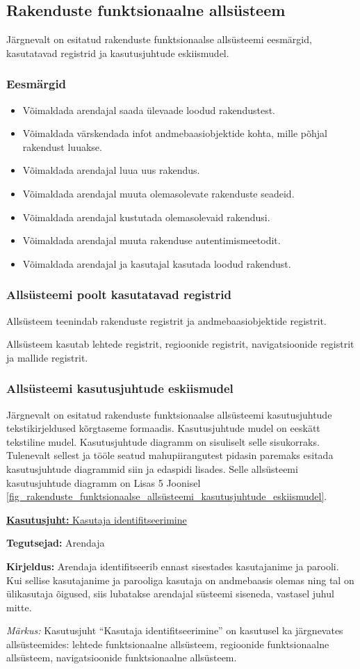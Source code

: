 \documentclass[a4paper,12pt]{article} %
\begin{document}
\subsection{Rakenduste funktsionaalne allsüsteem}
Järgnevalt on esitatud rakenduste funktsionaalse allsüsteemi eesmärgid, kasutatavad registrid ja kasutusjuhtude eskiismudel.
\subsubsection{Eesmärgid}
\begin{itemize}
\item Võimaldada arendajal saada ülevaade loodud rakendustest.
\item Võimaldada värskendada infot andmebaasiobjektide kohta, mille põhjal rakendust luuakse.
\item Võimaldada arendajal luua uus rakendus.
\item Võimaldada arendajal muuta olemasolevate rakenduste seadeid.
\item Võimaldada arendajal kustutada olemasolevaid rakendusi.
\item Võimaldada arendajal muuta rakenduse autentimismeetodit.
\item Võimaldada arendajal ja kasutajal kasutada loodud rakendust.
\end{itemize}
\subsubsection{Allsüsteemi poolt kasutatavad registrid}
Allsüsteem teenindab rakenduste registrit ja andmebaasiobjektide registrit.\par
Allsüsteem kasutab lehtede registrit, regioonide registrit, navigatsioonide registrit ja mallide registrit.
\subsubsection{Allsüsteemi kasutusjuhtude eskiismudel}
Järgnevalt on esitatud rakenduste funktsionaalse allsüsteemi kasutusjuhtude tekstikirjeldused kõrgtaseme formaadis. Kasutusjuhtude mudel on eeskätt tekstiline mudel. Kasutusjuhtude diagramm on sisuliselt selle sisukorraks. Tulenevalt sellest ja tööle seatud mahupiirangutest pidasin paremaks esitada kasutusjuhtude diagrammid siin ja edaspidi lisades. Selle allsüsteemi kasutusjuhtude diagramm on Lisas 5 Joonisel \ref{fig_rakenduste_funktsionaalse_allsüsteemi_kasutusjuhtude_eskiismudel}.

\underline{\textbf{Kasutusjuht:} Kasutaja identifitseerimine}
\par
\textbf{Tegutsejad:} Arendaja
\par
\textbf{Kirjeldus:} Arendaja identifitseerib ennast sisestades kasutajanime ja parooli. Kui sellise kasutajanime ja parooliga kasutaja on andmebaasis olemas ning tal on ülikasutaja õigused, siis lubatakse arendajal süsteemi siseneda, vastasel juhul mitte.
\par
\textit{Märkus:} Kasutusjuht  ``Kasutaja identifitseerimine'' on kasutusel ka järgnevates allsüsteemides: lehtede funktsionaalne allsüsteem, regioonide funktsionaalne allsüsteem, navigatsioonide funktsionaalne allsüsteem.\par
\end{document}
